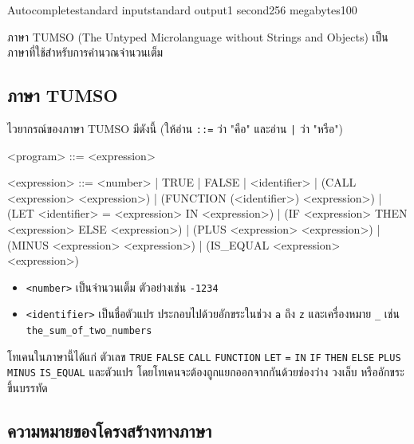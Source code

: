 \documentclass[11pt,a4paper]{article}
\begin{document}
\begin{problem}{Autocomplete}{standard input}{standard output}{1 second}{256 megabytes}{100}

  ภาษา TUMSO (The Untyped Microlanguage without Strings and Objects) เป็นภาษาที่ใช้สำหรับการคำนวณจำนวนเต็ม

  \subsection*{ภาษา TUMSO}

  ไวยากรณ์ของภาษา TUMSO มีดังนี้ (ให้อ่าน \texttt{::=}  ว่า "คือ" และอ่าน \texttt{|} ว่า "หรือ")

  \begin{codetumso}[frame=single]
<program> ::= <expression>

<expression> ::= <number>
               | TRUE
               | FALSE
               | <identifier>
               | (CALL <expression> <expression>)
               | (FUNCTION (<identifier>) <expression>)
               | (LET <identifier> = <expression> IN <expression>)
               | (IF <expression> THEN <expression> ELSE <expression>)
               | (PLUS <expression> <expression>)
               | (MINUS <expression> <expression>)
               | (IS_EQUAL <expression> <expression>)
  \end{codetumso}

  \begin{itemize}
    \item \texttt{<number>} เป็นจำนวนเต็ม ตัวอย่างเช่น \texttt{-1234}
    \item \texttt{<identifier>} เป็นชื่อตัวแปร ประกอบไปด้วยอักขระในช่วง \texttt{a} ถึง \texttt{z} และเครื่องหมาย \texttt{\_} เช่น \texttt{the\_sum\_of\_two\_numbers}
  \end{itemize}

  โทเคนในภาษานี้ได้แก่ ตัวเลข \texttt{TRUE} \texttt{FALSE} \texttt{CALL} \texttt{FUNCTION} \texttt{LET} \texttt{=} \texttt{IN} \texttt{IF} \texttt{THEN} \texttt{ELSE} \texttt{PLUS} \texttt{MINUS} \texttt{IS\_EQUAL} และตัวแปร โดยโทเคนจะต้องถูกแยกออกจากกันด้วยช่องว่าง วงเล็บ หรืออักขระขึ้นบรรทัด

  \pagebreak

  \subsection*{ความหมายของโครงสร้างทางภาษา}


\end{problem}
\end{document}
